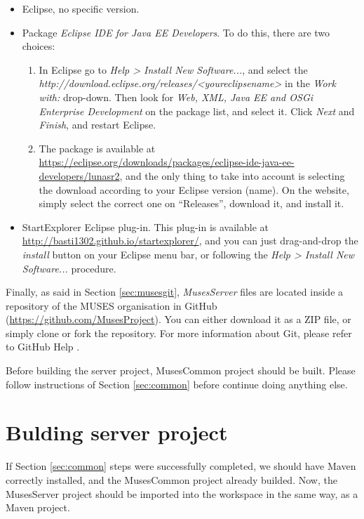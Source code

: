 \begin{itemize}
  \item Eclipse, no specific version.
  \item Package \textit{Eclipse IDE for Java EE Developers}. To do this, there are two choices:
  \begin{enumerate}
    \item In Eclipse go to \textit{Help > Install New Software...}, and select the \textit{http://download.eclipse.org/releases/<youreclipsename>} in the \textit{Work with:} drop-down. Then look for \textit{Web, XML, Java EE and OSGi Enterprise Development} on the package list, and select it. Click \textit{Next} and \textit{Finish}, and restart Eclipse.
    \item The package is available at \url{https://eclipse.org/downloads/packages/eclipse-ide-java-ee-developers/lunasr2}, and the only thing to take into account is selecting the download according to your Eclipse version (name). On the website, simply select the correct one on ``Releases'', download it, and install it.
  \end{enumerate} 
  \item StartExplorer Eclipse plug-in. This plug-in is available at \url{http://basti1302.github.io/startexplorer/}, and you can just drag-and-drop the \textit{install} button on your Eclipse menu bar, or following the \textit{Help > Install New Software...} procedure.
\end{itemize}

Finally, as said in Section \ref{sec:musesgit}, \textit{MusesServer} files are located inside a repository of the MUSES organisation in GitHub (\url{https://github.com/MusesProject}). You can either download it as a ZIP file, or simply clone or fork the repository. For more information about Git, please refer to GitHub Help \cite{githelp:site}.

Before building the server project, MusesCommon project should be built. Please follow instructions of Section \ref{sec:common} before continue doing anything else.

\section{Bulding server project}
\label{sec:buildserver}

If Section \ref{sec:common} steps were successfully completed, we should have Maven correctly installed, and the MusesCommon project already builded. Now, the MusesServer project should be imported into the workspace in the same way, as a Maven project.

